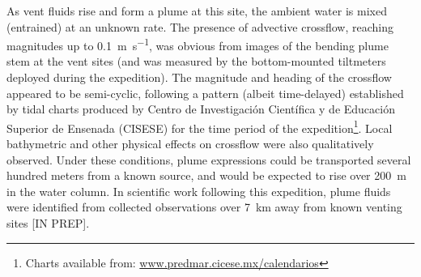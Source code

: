 As vent fluids rise and form a plume at this site, the ambient water is mixed (entrained) at an unknown rate. The presence of advective crossflow, reaching magnitudes up to \SI{0.1}{\meter\per\second}, was obvious from images of the bending plume stem at the vent sites (and was measured by the bottom-mounted tiltmeters deployed during the expedition). The magnitude and heading of the crossflow appeared to be semi-cyclic, following a pattern (albeit time-delayed) established by tidal charts produced by Centro de Investigaci\'on Cient\'ifica y de Educaci\'on Superior de Ensenada (CISESE) for the time period of the expedition\footnote{Charts available from: \url{www.predmar.cicese.mx/calendarios}}. Local bathymetric and other physical effects on crossflow were also qualitatively observed. Under these conditions, plume expressions could be transported several hundred meters from a known source, and would be expected to rise over \SI{200}{\meter} in the water column. In scientific work following this expedition, plume fluids were identified from collected observations over \SI{7}{\kilo\meter} away from known venting sites [IN PREP]. 


